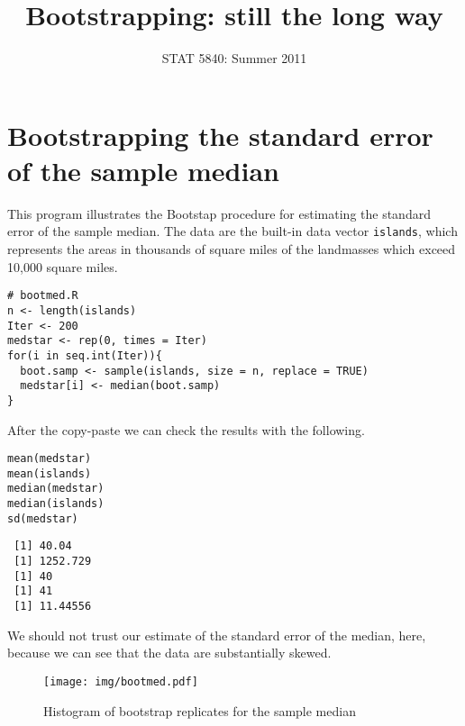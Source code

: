 \documentclass[11pt,english]{article}
\title{Bootstrapping: still the long way}
\date{STAT 5840: Summer 2011}
\begin{document}
\maketitle

\thispagestyle{empty}

\section*{Bootstrapping the standard error of the sample median}
\label{sec-1}

This program illustrates the Bootstap procedure for estimating the standard error of the sample median.  The data are the built-in data vector \texttt{islands}, which represents the areas in thousands of square miles of the landmasses which exceed 10,000 square miles.


\begin{verbatim}
# bootmed.R
n <- length(islands)     
Iter <- 200
medstar <- rep(0, times = Iter)
for(i in seq.int(Iter)){
  boot.samp <- sample(islands, size = n, replace = TRUE)
  medstar[i] <- median(boot.samp)
}
\end{verbatim}

After the copy-paste we can check the results with the following.
\begin{verbatim}
mean(medstar)
mean(islands)
median(medstar)
median(islands)
sd(medstar)
\end{verbatim}

\begin{verbatim}
 [1] 40.04
 [1] 1252.729
 [1] 40
 [1] 41
 [1] 11.44556
\end{verbatim}


We should not trust our estimate of the standard error of the median, here, because we can see that the data are substantially skewed.



\begin{figure}[h!]
\centering
\texttt{[image: img/bootmed.pdf]}
\caption{\label{fig:yplot}Histogram of bootstrap replicates for the sample median}
\end{figure}
\end{document}
